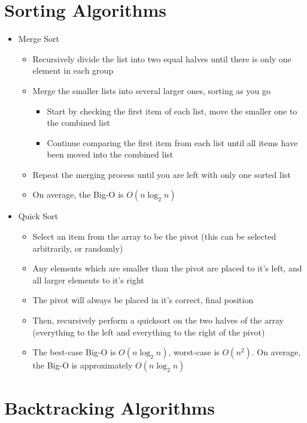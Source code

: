 
\section*{Sorting Algorithms}

\begin{itemize}
  \item Merge Sort
  \begin{itemize}
    \item Recursively divide the list into two equal halves until there is only one element in each group
    \item Merge the smaller lists into several larger ones, sorting as you go
    \begin{itemize}
      \item Start by checking the first item of each list, move the smaller one to the combined list
      \item Continue comparing the first item from each list until all items have been moved into the combined list
    \end{itemize}
    \item Repeat the merging process until you are left with only one sorted list
    \item On average, the Big-O is $O(n \log_2 n)$
  \end{itemize}
  \item Quick Sort
  \begin{itemize}
    \item Select an item from the array to be the pivot (this can be selected arbitrarily, or randomly)
    \item Any elements which are smaller than the pivot are placed to it's left, and all larger elements to it's right
    \item The pivot will always be placed in it's correct, final position
    \item Then, recursively perform a quicksort on the two halves of the array (everything to the left and everything to the right of the pivot)
    \item The best-case Big-O is $O(n \log_2 n)$, worst-case is $O(n^{2})$. On average, the Big-O is approximately $O(n \log_2 n)$
  \end{itemize}
\end{itemize}

\section*{Backtracking Algorithms}

